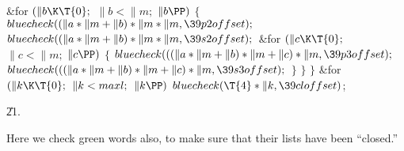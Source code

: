 \&{for} ${}(\|b\K\T{0};{}$ ${}\|b<\|m;{}$ ${}\|b\PP){}$\5
${}\{{}$\1\6
${}\\{bluecheck}((\|a*\|m+\|b)*\|m*\|m,\39\\{p2offset});{}$\6
${}\\{bluecheck}((\|a*\|m+\|b)*\|m*\|m,\39\\{s2offset});{}$\6
\&{for} ${}(\|c\K\T{0};{}$ ${}\|c<\|m;{}$ ${}\|c\PP){}$\5
${}\{{}$\1\6
${}\\{bluecheck}(((\|a*\|m+\|b)*\|m+\|c)*\|m,\39\\{p3offset});{}$\6
${}\\{bluecheck}(((\|a*\|m+\|b)*\|m+\|c)*\|m,\39\\{s3offset});{}$\6
\4${}\}{}$\2\6
\4${}\}{}$\2\6
\4${}\}{}$\2\6
\&{for} ${}(\|k\K\T{0};{}$ ${}\|k<\\{maxl};{}$ ${}\|k\PP){}$\1\5
${}\\{bluecheck}(\T{4}*\|k,\39\\{cloffset}){}$;\2\par
\U21.\fi

Here we check green words also, to make sure that
their lists have
been ``closed.''


